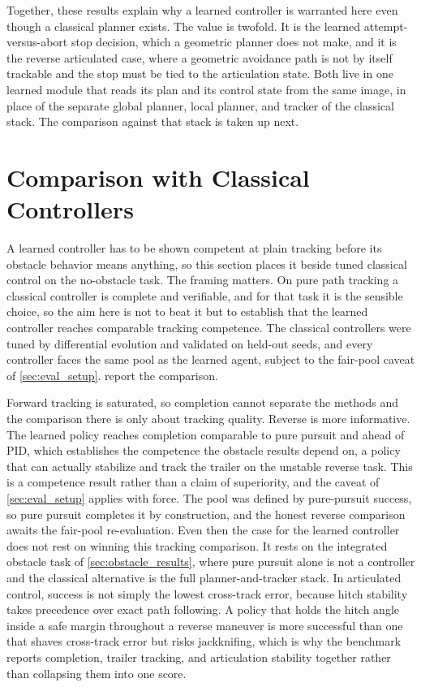 Together, these results explain why a learned controller is warranted here even though a classical planner exists. The value is twofold. It is the learned attempt-versus-abort stop decision, which a geometric planner does not make, and it is the reverse articulated case, where a geometric avoidance path is not by itself trackable and the stop must be tied to the articulation state. Both live in one learned module that reads its plan and its control state from the same image, in place of the separate global planner, local planner, and tracker of the classical stack. The comparison against that stack is taken up next.

\section{Comparison with Classical Controllers}
\label{sec:benchmark}

A learned controller has to be shown competent at plain tracking before its obstacle behavior means anything, so this section places it beside tuned classical control on the no-obstacle task. The framing matters. On pure path tracking a classical controller is complete and verifiable, and for that task it is the sensible choice, so the aim here is not to beat it but to establish that the learned controller reaches comparable tracking competence. The classical controllers were tuned by differential evolution and validated on held-out seeds, and every controller faces the same pool as the learned agent, subject to the fair-pool caveat of \cref{sec:eval_setup}.  report the comparison.



Forward tracking is saturated, so completion cannot separate the methods and the comparison there is only about tracking quality. Reverse is more informative. The learned policy reaches completion comparable to pure pursuit and ahead of PID, which establishes the competence the obstacle results depend on, a policy that can actually stabilize and track the trailer on the unstable reverse task. This is a competence result rather than a claim of superiority, and the caveat of \cref{sec:eval_setup} applies with force. The pool was defined by pure-pursuit success, so pure pursuit completes it by construction, and the honest reverse comparison awaits the fair-pool re-evaluation. Even then the case for the learned controller does not rest on winning this tracking comparison. It rests on the integrated obstacle task of \cref{sec:obstacle_results}, where pure pursuit alone is not a controller and the classical alternative is the full planner-and-tracker stack. In articulated control, success is not simply the lowest cross-track error, because hitch stability takes precedence over exact path following. A policy that holds the hitch angle inside a safe margin throughout a reverse maneuver is more successful than one that shaves cross-track error but risks jackknifing, which is why the benchmark reports completion, trailer tracking, and articulation stability together rather than collapsing them into one score.

